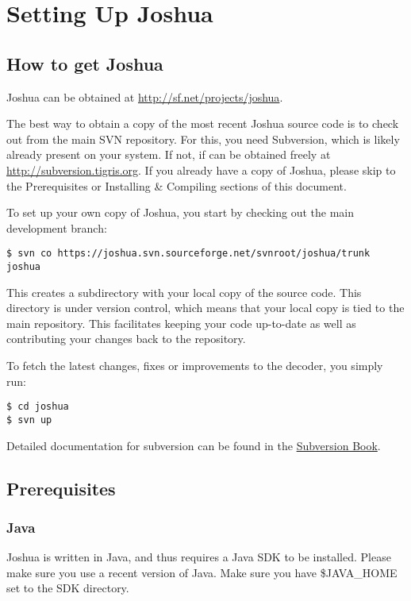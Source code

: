 \chapter{Setting Up Joshua}

\section{How to get Joshua}
\label{sec:get-joshua}

Joshua can be obtained at \url{http://sf.net/projects/joshua}.

The best way to obtain a copy of the most recent Joshua source code is to check
out from the main SVN repository. For this, you need Subversion, which
is likely already present on your system. If not, if can be obtained
freely at \url{http://subversion.tigris.org}. If you already have a copy of
Joshua, please skip to the Prerequisites or Installing \& Compiling
sections of this document.

To set up your own copy of Joshua, you start by checking out the main
development branch:

\begin{verbatim}
$ svn co https://joshua.svn.sourceforge.net/svnroot/joshua/trunk joshua
\end{verbatim}

This creates a subdirectory with your local copy of the source
code. This directory is under version control, which means that your
local copy is tied to the main repository. This facilitates keeping
your code up-to-date as well as contributing your changes back to the
repository.

To fetch the latest changes, fixes or improvements to the decoder, you
simply run:

\begin{verbatim}
$ cd joshua
$ svn up
\end{verbatim}

Detailed documentation for subversion can be found in the \href{http://svnbook.red-bean.com}{Subversion Book}.


\section{Prerequisites}

\subsection{Java}

Joshua is written in Java, and thus requires a Java SDK to be
installed. Please make sure you use a recent version of Java. Make
sure you have \$JAVA\_HOME set to the SDK directory.

